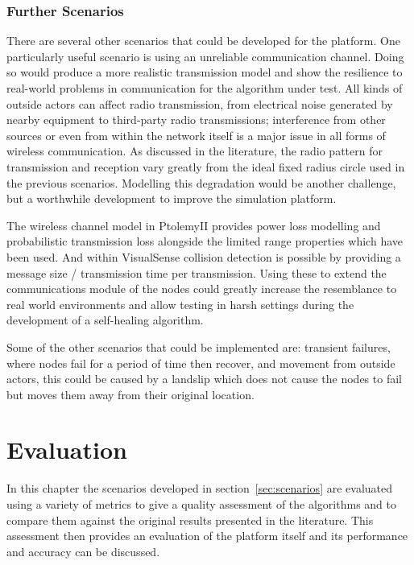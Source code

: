 \documentclass[authoryearcitations]{UoYCSproject}
\begin{document}
\subsection{Further Scenarios}
\label{subsec:otherScenarios}
There are several other scenarios that could be developed for the platform. One particularly useful scenario is using an unreliable communication channel. Doing so would produce a more realistic transmission model and show the resilience to real-world problems in communication for the algorithm under test. All kinds of outside actors can affect radio transmission, from electrical noise generated by nearby equipment to third-party radio transmissions; interference from other sources or even from within the network itself is a major issue in all forms of wireless communication. As discussed in the literature, the radio pattern for transmission and reception vary greatly from the ideal fixed radius circle used in the previous scenarios. Modelling this degradation would be another challenge, but a worthwhile development to improve the simulation platform.

The wireless channel model in PtolemyII provides power loss modelling and probabilistic transmission loss alongside the limited range properties which have been used. And within VisualSense collision detection is possible by providing a message size / transmission time per transmission. Using these to extend the communications module of the nodes could greatly increase the resemblance to real world environments and allow testing in harsh settings during the development of a self-healing algorithm.

Some of the other scenarios that could be implemented are: transient failures, where nodes fail for a period of time then recover, and movement from outside actors, this could be caused by a landslip which does not cause the nodes to fail but moves them away from their original location.

\chapter{Evaluation}
\label{cha:Eval}

In this chapter the scenarios developed in section~\ref{sec:scenarios} are evaluated using a variety of metrics to give a quality assessment of the algorithms and to compare them against the original results presented in the literature. This assessment then provides an evaluation of the platform itself and its performance and accuracy can be discussed.
\end{document}
